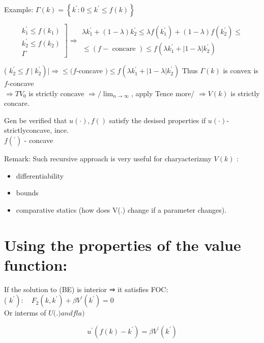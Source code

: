 \documentclass[10pt]{article}
\begin{document}
Example: $\Gamma(k)=\left\{k^{\prime}: 0 \leq k^{\prime} \leq f(k)\right\}$

$$
\left.\begin{array}{c}
k_{1}^{\prime} \leq f\left(k_{1}\right) \\
k_{2}^{\prime} \leq f\left(k_{2}\right) \\
\Gamma
\end{array}\right] \Rightarrow \begin{gathered}
\lambda k_{1}^{\prime}+(1-\lambda) k_{2}^{\prime} \leq \lambda f\left(k_{1}^{\prime}\right)+(1-\lambda) f\left(k_{2}^{\prime}\right) \leq \\
\leq(f-\text { concare }) \leq f\left(\lambda k_{1}^{\prime}+|1-\lambda| k_{2}^{\prime}\right)
\end{gathered}
$$

( $\left.k_{2}^{\prime} \leq f \mid k_{2}^{\prime}\right) \mid \Rightarrow \leq(f$-concave $) \leq f\left(\lambda k_{1}^{\prime}+|1-\lambda| k_{2}^{\prime}\right)$ Thus $\Gamma(k)$ is convex is $f$-concave\\
$\Rightarrow T V_{0}$ is strictly concave $\Rightarrow / \lim _{n \rightarrow \infty}$, apply Tence more/ $\Rightarrow V(k)$ is strictly concare.

Gen be verified that $u(\cdot), f()$ satisfy the desised properties if $u(\cdot)$-strictlyconcave, ince.\\
$f\left({ }^{\prime}\right)$ - concave

Remark: Such recursive approach is very useful for charyacterizmy $V(k)$ :

\begin{itemize}
  \item differentiability
  \item bounds
  \item comparative statics (how does V(.) change if a parameter changes).
\end{itemize}

\section*{Using the properties of the value function:}
If the solution to (BE) is interior ⇒ it satisfies FOC:\\
( $\left.k^{\prime}\right): \quad F_{2}\left(k, k^{\prime}\right)+\beta V^{\prime}\left(k^{\prime}\right)=0$\\
Or interms of $U($.$) and fla)$

$$
u^{\prime}\left(f(k)-k^{\prime}\right)=\beta V^{\prime}\left(k^{\prime}\right)
$$
\end{document}
